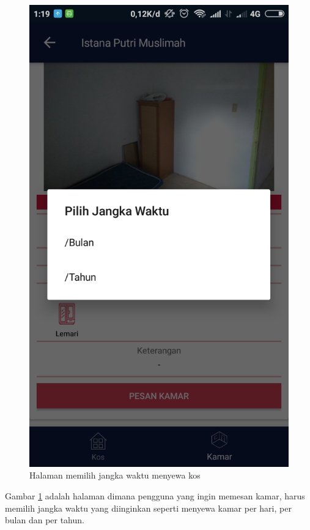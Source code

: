 		\begin{figure}[H]
			\centering
			\includegraphics[scale=0.25]{gambar/and/12}
			\caption{Halaman memilih jangka waktu menyewa kos}
			\label{and10}
		\end{figure}
	
		Gambar \ref{and10} adalah halaman dimana pengguna yang ingin memesan kamar, harus memilih jangka waktu yang diinginkan seperti menyewa kamar per hari, per bulan dan per tahun.
		
